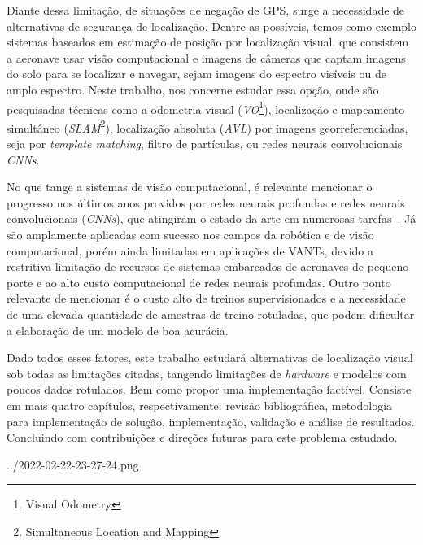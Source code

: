 Diante dessa limitação, de situações de negação de GPS, surge a necessidade de alternativas de segurança de localização. Dentre as possíveis, temos como exemplo sistemas baseados em estimação de posição por localização visual, que consistem a aeronave usar visão computacional e imagens de câmeras que captam imagens do solo para se localizar e navegar, sejam imagens do espectro visíveis ou de amplo espectro. Neste trabalho, nos concerne estudar essa opção, onde são pesquisadas técnicas como a odometria visual (\textit{VO}\footnote{Visual Odometry}), localização e mapeamento simultâneo (\textit{SLAM}\footnote{Simultaneous Location and Mapping}), localização absoluta (\textit{AVL}) por imagens georreferenciadas, seja por \textit{template matching}, filtro de partículas, ou redes neurais convolucionais \textit{CNNs}.

No que tange a sistemas de visão computacional, é relevante mencionar o progresso nos últimos anos providos por redes neurais profundas e redes neurais convolucionais (\textit{CNNs}), que atingiram o estado da arte em numerosas tarefas~\cite{ABIODUN2018e00938}. Já são amplamente aplicadas com sucesso nos campos da robótica e de visão computacional, porém ainda limitadas em aplicações de VANTs, devido a restritiva limitação de recursos de sistemas embarcados de aeronaves de pequeno porte e ao alto custo computacional de redes neurais profundas. Outro ponto relevante de mencionar é o custo alto de treinos supervisionados e a necessidade de uma elevada quantidade de amostras de treino rotuladas, que podem dificultar a elaboração de um modelo de boa acurácia.

Dado todos esses fatores, este trabalho estudará alternativas de localização visual sob todas as limitações citadas, tangendo limitações de \textit{hardware} e modelos com poucos dados rotulados. Bem como propor uma implementação factível. Consiste em mais quatro capítulos, respectivamente: revisão bibliográfica, metodologia para implementação de solução, implementação, validação e análise de resultados. Concluindo com contribuições e direções futuras para este problema estudado.


../2022-02-22-23-27-24.png